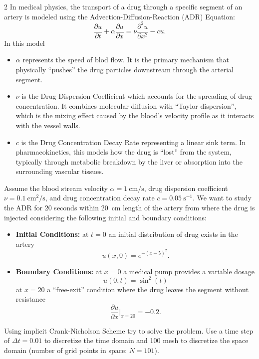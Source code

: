   \vspace*{1cm}
  \begin{problem}{2}
    In medical physics, the transport of a drug through a specific segment of an artery is modeled using the Advection-Diffusion-Reaction (ADR) Equation:
    \begin{equation*}
      \frac{\partial u}{\partial t}  + \alpha \frac{\partial u}{\partial x}  = \nu \frac{\partial ^2 u}{\partial x^2} - cu
    .\end{equation*}
    In this model
    \begin{itemize}
      \item $\alpha$ represents the speed of blod flow.
        It is the primary mechanism that physically ``pushes'' the drug particles downstream through the arterial segment.
      \item $\nu$ is the Drug Dispersion Coefficient which accounts for the spreading of drug concentration.
        It combines molecular diffusion with ``Taylor dispersion'', which is the mixing effect caused by the blood's velocity profile as it interacts with the vessel walls.
      \item $c$ is the Drug Concentration Decay Rate representing a linear sink term.
        In pharmacokinetics, this models how the drug is ``lost'' from the system, typically through metabolic breakdown by the liver or absorption into the surrounding vascular tissues.
    \end{itemize}
    Assume the blood stream velocity $\alpha = \qty{1}{\cm\per\s}$, drug dispersion coefficient $\nu = \qty{0,1}{\cm^2\per\s} $, and drug concentration decay rate $c = \qty{0,05}{\s^{-1}}$.
    We want to study the ADR for 20 seconds within \qty{20}{\cm} length of the artery from where the drug is injected considering the following initial and boundary conditions:
    \begin{itemize}
      \item \textbf{Initial Conditions:} at $t = 0$ an initial distribution of drug exists in the artery
        \begin{equation*}
          u(x,0) = e^{-(x-5)^2}
        .\end{equation*}
      \item \textbf{Boundary Conditions:} at $x = 0$ a medical pump provides a variable dosage
        \begin{equation*}
          u(0,t) = \sin^2(t)
        \end{equation*}
        at $x = 20$ a ``free-exit'' condition where the drug leaves the segment without resistance
        \begin{equation*}
          \frac{\partial u}{\partial x} \bigg|_{x = 20} = \num{-0,2} 
        .\end{equation*}
    \end{itemize}
    Using implicit Crank-Nicholson Scheme try to solve the problem.
    Use a time step of $\Delta t = \num{0,01}$ to discretize the time domain and 100 mesh to discretize the space domain (number of grid points in space: $N = 101$).


\end{problem}
